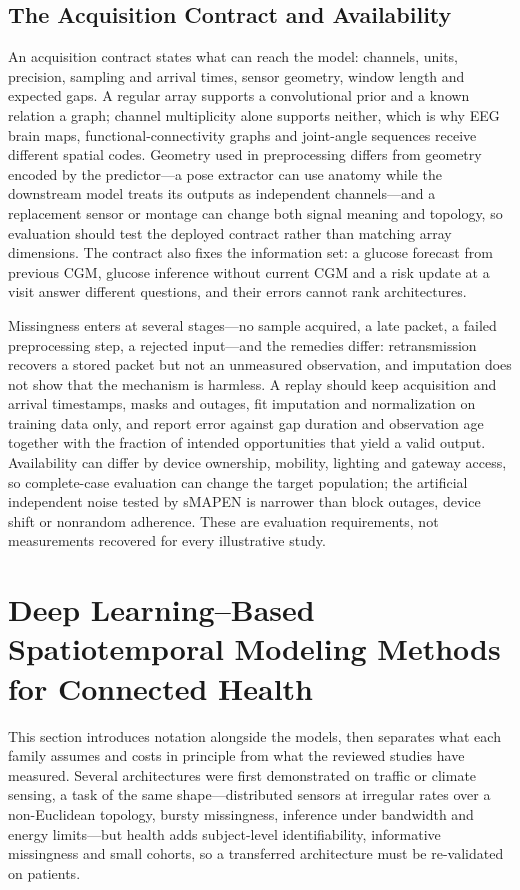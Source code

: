 \documentclass[journal]{IEEEtran}
\begin{document}
\subsection{The Acquisition Contract and Availability}
\label{sec:acquisitioncontract}
\label{sec:availability}
An acquisition contract states what can reach the model: channels, units, precision, sampling and arrival times, sensor geometry, window length and expected gaps. A regular array supports a convolutional prior and a known relation a graph; channel multiplicity alone supports neither, which is why EEG brain maps, functional-connectivity graphs and joint-angle sequences receive different spatial codes. Geometry used in preprocessing differs from geometry encoded by the predictor---a pose extractor can use anatomy while the downstream model treats its outputs as independent channels---and a replacement sensor or montage can change both signal meaning and topology, so evaluation should test the deployed contract rather than matching array dimensions. The contract also fixes the information set: a glucose forecast from previous CGM, glucose inference without current CGM and a risk update at a visit answer different questions, and their errors cannot rank architectures.

Missingness enters at several stages---no sample acquired, a late packet, a failed preprocessing step, a rejected input---and the remedies differ: retransmission recovers a stored packet but not an unmeasured observation, and imputation does not show that the mechanism is harmless. A replay should keep acquisition and arrival timestamps, masks and outages, fit imputation and normalization on training data only, and report error against gap duration and observation age together with the fraction of intended opportunities that yield a valid output. Availability can differ by device ownership, mobility, lighting and gateway access, so complete-case evaluation can change the target population; the artificial independent noise tested by sMAPEN is narrower than block outages, device shift or nonrandom adherence. These are evaluation requirements, not measurements recovered for every illustrative study.

\section{Deep Learning--Based Spatiotemporal Modeling Methods for Connected Health}
\label{sec:history}
This section introduces notation alongside the models, then separates what each family assumes and costs in principle from what the reviewed studies have measured. Several architectures were first demonstrated on traffic or climate sensing, a task of the same shape---distributed sensors at irregular rates over a non-Euclidean topology, bursty missingness, inference under bandwidth and energy limits---but health adds subject-level identifiability, informative missingness and small cohorts, so a transferred architecture must be re-validated on patients.
\end{document}
